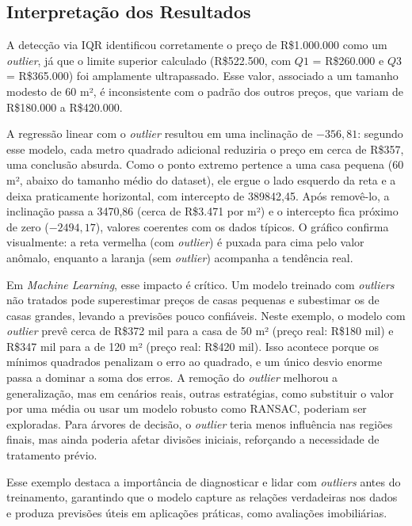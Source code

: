 \documentclass[a4paper,12pt,openany]{book}
\begin{document}
\subsection{Interpretação dos Resultados}
A detecção via IQR identificou corretamente o preço de R\$1.000.000 como um \textit{outlier}, já que o limite superior calculado (R\$522.500, com $Q1$ = R\$260.000 e $Q3$ = R\$365.000) foi amplamente ultrapassado. Esse valor, associado a um tamanho modesto de 60 m², é inconsistente com o padrão dos outros preços, que variam de R\$180.000 a R\$420.000.

A regressão linear com o \textit{outlier} resultou em uma inclinação de $-356,81$: segundo esse modelo, cada metro quadrado adicional reduziria o preço em cerca de R\$357, uma conclusão absurda. Como o ponto extremo pertence a uma casa pequena (60 m², abaixo do tamanho médio do dataset), ele ergue o lado esquerdo da reta e a deixa praticamente horizontal, com intercepto de 389842,45. Após removê-lo, a inclinação passa a 3470,86 (cerca de R\$3.471 por m²) e o intercepto fica próximo de zero ($-2494,17$), valores coerentes com os dados típicos. O gráfico confirma visualmente: a reta vermelha (com \textit{outlier}) é puxada para cima pelo valor anômalo, enquanto a laranja (sem \textit{outlier}) acompanha a tendência real.

Em \textit{Machine Learning}, esse impacto é crítico. Um modelo treinado com \textit{outliers} não tratados pode superestimar preços de casas pequenas e subestimar os de casas grandes, levando a previsões pouco confiáveis. Neste exemplo, o modelo com \textit{outlier} prevê cerca de R\$372 mil para a casa de 50 m² (preço real: R\$180 mil) e R\$347 mil para a de 120 m² (preço real: R\$420 mil). Isso acontece porque os mínimos quadrados penalizam o erro ao quadrado, e um único desvio enorme passa a dominar a soma dos erros. A remoção do \textit{outlier} melhorou a generalização, mas em cenários reais, outras estratégias, como substituir o valor por uma média ou usar um modelo robusto como RANSAC, poderiam ser exploradas. Para árvores de decisão, o \textit{outlier} teria menos influência nas regiões finais, mas ainda poderia afetar divisões iniciais, reforçando a necessidade de tratamento prévio.

Esse exemplo destaca a importância de diagnosticar e lidar com \textit{outliers} antes do treinamento, garantindo que o modelo capture as relações verdadeiras nos dados e produza previsões úteis em aplicações práticas, como avaliações imobiliárias.
\end{document}
